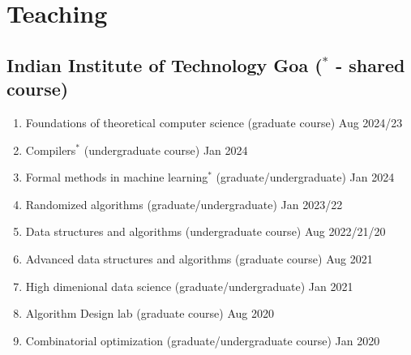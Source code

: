 \documentclass[11pt,a4paper,sans]{moderncv} %
\begin{document}
\section{Teaching}
					\subsection{ Indian Institute of Technology Goa  ($^*$ - shared course)}
					\begin{enumerate}
					\item {Foundations of theoretical computer science}  (graduate course) \hfill Aug 2024/23
					\item {Compilers$^*$} (undergraduate course) \hfill Jan 2024
					\item {Formal methods in machine learning$^*$} (graduate/undergraduate) \hfill Jan 2024
					\item Randomized algorithms (graduate/undergraduate) \hfill Jan 2023/22
					\item {Data structures and algorithms} (undergraduate course)  \hfill  Aug 2022/21/20
					\item {Advanced data structures and algorithms}  (graduate course)  \hfill Aug 2021
					\item {High dimenional data science} (graduate/undergraduate) \hfill Jan 2021
					\item {Algorithm Design lab} (graduate course) \hfill  Aug 2020
					\item {Combinatorial optimization} (graduate/undergraduate course) \hfill  Jan 2020

\end{enumerate}
\end{document}
